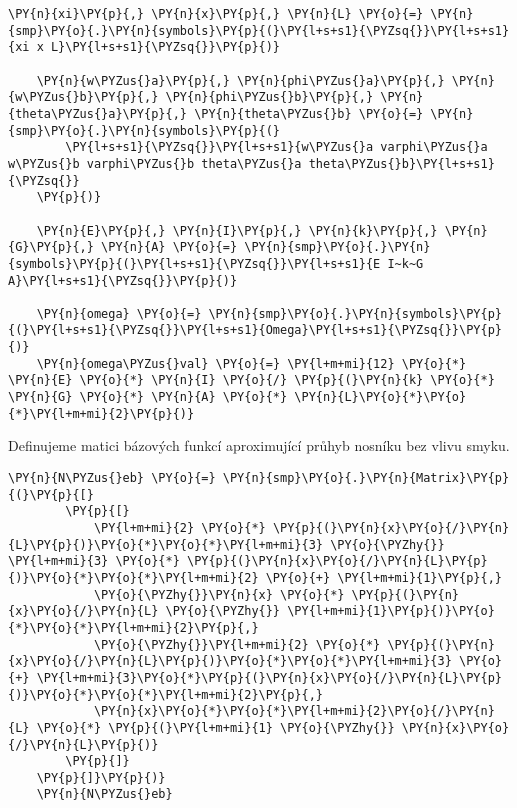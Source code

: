 \begin{tcolorbox}[breakable, size=fbox, boxrule=1pt, pad at break*=1mm,colback=cellbackground, colframe=cellborder]
    \begin{Verbatim}[commandchars=\\\{\}]
    \PY{n}{xi}\PY{p}{,} \PY{n}{x}\PY{p}{,} \PY{n}{L} \PY{o}{=} \PY{n}{smp}\PY{o}{.}\PY{n}{symbols}\PY{p}{(}\PY{l+s+s1}{\PYZsq{}}\PY{l+s+s1}{xi x L}\PY{l+s+s1}{\PYZsq{}}\PY{p}{)}
    
    \PY{n}{w\PYZus{}a}\PY{p}{,} \PY{n}{phi\PYZus{}a}\PY{p}{,} \PY{n}{w\PYZus{}b}\PY{p}{,} \PY{n}{phi\PYZus{}b}\PY{p}{,} \PY{n}{theta\PYZus{}a}\PY{p}{,} \PY{n}{theta\PYZus{}b} \PY{o}{=} \PY{n}{smp}\PY{o}{.}\PY{n}{symbols}\PY{p}{(}
        \PY{l+s+s1}{\PYZsq{}}\PY{l+s+s1}{w\PYZus{}a varphi\PYZus{}a w\PYZus{}b varphi\PYZus{}b theta\PYZus{}a theta\PYZus{}b}\PY{l+s+s1}{\PYZsq{}}
    \PY{p}{)}
    
    \PY{n}{E}\PY{p}{,} \PY{n}{I}\PY{p}{,} \PY{n}{k}\PY{p}{,} \PY{n}{G}\PY{p}{,} \PY{n}{A} \PY{o}{=} \PY{n}{smp}\PY{o}{.}\PY{n}{symbols}\PY{p}{(}\PY{l+s+s1}{\PYZsq{}}\PY{l+s+s1}{E I~k~G A}\PY{l+s+s1}{\PYZsq{}}\PY{p}{)}
    
    \PY{n}{omega} \PY{o}{=} \PY{n}{smp}\PY{o}{.}\PY{n}{symbols}\PY{p}{(}\PY{l+s+s1}{\PYZsq{}}\PY{l+s+s1}{Omega}\PY{l+s+s1}{\PYZsq{}}\PY{p}{)}
    \PY{n}{omega\PYZus{}val} \PY{o}{=} \PY{l+m+mi}{12} \PY{o}{*} \PY{n}{E} \PY{o}{*} \PY{n}{I} \PY{o}{/} \PY{p}{(}\PY{n}{k} \PY{o}{*} \PY{n}{G} \PY{o}{*} \PY{n}{A} \PY{o}{*} \PY{n}{L}\PY{o}{*}\PY{o}{*}\PY{l+m+mi}{2}\PY{p}{)}
    \end{Verbatim}
\end{tcolorbox}
 

Definujeme matici bázových funkcí aproximující průhyb nosníku bez vlivu smyku.
\begin{tcolorbox}[breakable, size=fbox, boxrule=1pt, pad at break*=1mm,colback=cellbackground, colframe=cellborder]
    \begin{Verbatim}[commandchars=\\\{\}]
    \PY{n}{N\PYZus{}eb} \PY{o}{=} \PY{n}{smp}\PY{o}{.}\PY{n}{Matrix}\PY{p}{(}\PY{p}{[}
        \PY{p}{[}
            \PY{l+m+mi}{2} \PY{o}{*} \PY{p}{(}\PY{n}{x}\PY{o}{/}\PY{n}{L}\PY{p}{)}\PY{o}{*}\PY{o}{*}\PY{l+m+mi}{3} \PY{o}{\PYZhy{}} \PY{l+m+mi}{3} \PY{o}{*} \PY{p}{(}\PY{n}{x}\PY{o}{/}\PY{n}{L}\PY{p}{)}\PY{o}{*}\PY{o}{*}\PY{l+m+mi}{2} \PY{o}{+} \PY{l+m+mi}{1}\PY{p}{,}
            \PY{o}{\PYZhy{}}\PY{n}{x} \PY{o}{*} \PY{p}{(}\PY{n}{x}\PY{o}{/}\PY{n}{L} \PY{o}{\PYZhy{}} \PY{l+m+mi}{1}\PY{p}{)}\PY{o}{*}\PY{o}{*}\PY{l+m+mi}{2}\PY{p}{,}
            \PY{o}{\PYZhy{}}\PY{l+m+mi}{2} \PY{o}{*} \PY{p}{(}\PY{n}{x}\PY{o}{/}\PY{n}{L}\PY{p}{)}\PY{o}{*}\PY{o}{*}\PY{l+m+mi}{3} \PY{o}{+} \PY{l+m+mi}{3}\PY{o}{*}\PY{p}{(}\PY{n}{x}\PY{o}{/}\PY{n}{L}\PY{p}{)}\PY{o}{*}\PY{o}{*}\PY{l+m+mi}{2}\PY{p}{,}
            \PY{n}{x}\PY{o}{*}\PY{o}{*}\PY{l+m+mi}{2}\PY{o}{/}\PY{n}{L} \PY{o}{*} \PY{p}{(}\PY{l+m+mi}{1} \PY{o}{\PYZhy{}} \PY{n}{x}\PY{o}{/}\PY{n}{L}\PY{p}{)}
        \PY{p}{]}
    \PY{p}{]}\PY{p}{)}
    \PY{n}{N\PYZus{}eb}
    \end{Verbatim}
\end{tcolorbox}
            
